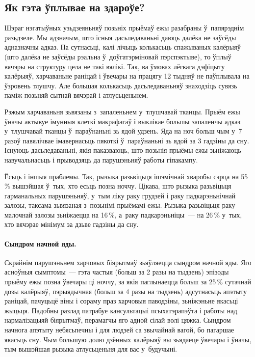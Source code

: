 \subsection{Як гэта ўплывае на здароўе?}

Шэраг нэгатыўных узьдзеяньняў позьніх прыёмаў ежы разабраны ў~папярэднім разьдзеле. Мы адзначым, што існыя дасьледаваньні даюць далёка не заўсёды адназначны адказ. Па сутнасьці, калі лічыць колькасьць спажываных калёрыяў (што далёка не заўсёды рэальна ў~доўгатэрміновай пэрспэктыве), то ўплыў вячэры на структуру цела не такі вялікі. Так, ва ўмовах лёгкага дэфіцыту калёрыяў, харчаваньне раніцай і ўвечары на працягу 12 тыдняў не паўплывала на ўзровень тлушчу. Але большая колькасьць дасьледаваньняў знаходзіць сувязь паміж позьняй сытнай вячэрай і атлусьценьнем.

Рэжым харчаваньня зьвязаны з~запаленьнем у~тлушчавай тканцы. Прыём ежы ўначы актывуе імунныя клеткі макрафагаў і выклікае большы запаленчы адказ у~тлушчавай тканцы ў~параўнаньні зь ядой удзень. Яда на ноч больш чым у~7 разоў павялічвае імавернасьць пякоткі ў~параўнаньні зь ядой за 3 гадзіны да сну. Існуюць дасьледаваньні, якія паказваюць, што позьнія прыёмы ежы зьніжаюць навучальнасьць і прыводзяць да парушэньняў работы гіпакампу.

Ёсьць і іншыя праблемы. Так, рызыка разьвіцьця ішэмічнай хваробы сэрца на 55\,\% вышэйшая ў~тых, хто есьць позна ноччу. Цікава, што рызыка разьвіцьця гарманальных парушэньняў, у~тым ліку раку грудзей і раку падкарэньнічнай залозы, таксама зьвязаная з~позьнімі прыёмамі ежы. Рызыка разьвіцьця раку малочнай залозы зьніжаецца на 16\,\%, а~раку падкарэньніцы~--- на 26\,\% у~тых, хто вячэрае мінімум за дзьве гадзіны да сну.

\paragraph{Сындром начной яды.}
Скрайнім парушэньнем харчовых біярытмаў зьяўляецца сындром начной яды. Яго асноўныя сымптомы~--- гэта частыя (больш за 2 разы на тыдзень) эпізоды прыёму ежы позна ўвечары ці ноччу, за якія паглынаецца больш за 25\,\% сутачнай дозы калёрыяў, пэрыядычная (больш за 4 разы на тыдзень) адсутнасьць апэтыту раніцай, пачуцьцё віны і сораму праз харчовыя паводзіны, зьніжэньне якасьці жыцьця. Падобны разлад патрабуе кансультацыі псыхатэрапэўта і работы над нармалізацыяй біярытмаў, перамагчы яго адной сілай волі цяжка. Сындром начнога апэтыту небясьпечны і для людзей са звычайнай вагой, бо пагаршае якасьць сну. Чым большую долю дзённых калёрыяў вы зьядаеце ўвечары і ўначы, тым вышэйшая рызыка атлусьценьня для вас у~будучыні.

